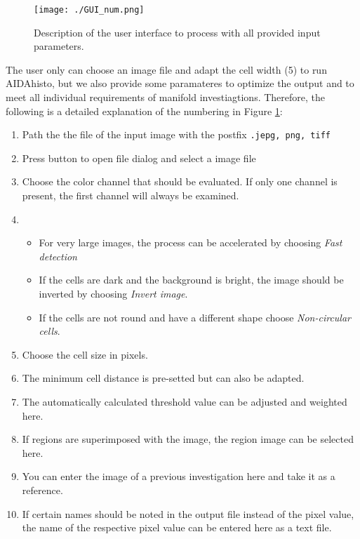 \documentclass[12pt]{article}
\begin{document}
\begin{figure}[H]
\centering
  \texttt{[image: ./GUI\_num.png]}
  \caption{Description of the user interface to process with all provided input parameters.}
  \label{fig:gui}
\end{figure}
The user only can choose an image file and adapt the cell width (5) to run AIDAhisto, but we also provide some paramateres to optimize the output and to meet all individual requirements of manifold investiagtions. Therefore, the following is a detailed explanation of the numbering in Figure \ref{fig:gui}:
\begin{enumerate}
	\item Path the the file of the input image with the postfix {\tt .jepg, png, tiff}
	\item Press button to open file dialog and select a image file
	\item Choose the color channel that should be evaluated. If only one channel is present, the first channel will always be examined.
	\item \begin{itemize}
		\item For very large images, the process can be accelerated by choosing \textit{Fast detection}
		\item  If the cells are dark and the background is bright, the image should be inverted by choosing \textit{Invert image}. 
		\item If the cells are not round and have a different shape choose \textit{Non-circular cells}.
	\end{itemize} 	
	\item Choose the cell size in pixels.
	\item The minimum cell distance is pre-setted but can also be adapted.
	\item The automatically calculated threshold value can be adjusted and weighted here.
	\item If regions are superimposed with the image, the region image can be selected here.
	\item You can enter the image of a previous investigation here and take it as a reference.
	\item If certain names should be  noted in the output file instead of the pixel value, the name of the respective pixel value can be entered here as a text file.
\end{enumerate}
\end{document}
